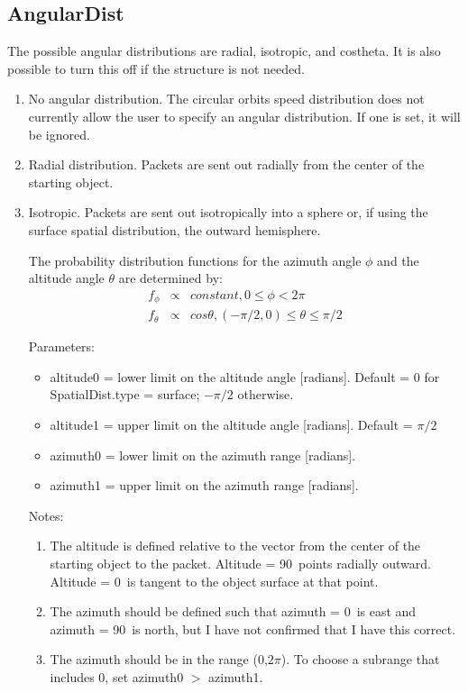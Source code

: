 \documentclass[11pt]{article}
\begin{document}
\subsection{AngularDist}

The possible angular distributions are radial, isotropic, and costheta. It is
also possible to turn this off if the structure is not needed.

\begin{enumerate}
\item No angular distribution. The circular orbits speed distribution does not
currently allow the user to specify an angular distribution. If one is set, it
will be ignored.

\item Radial distribution. Packets are sent out radially from the center of the
starting object.

\item Isotropic. Packets are sent out isotropically into a sphere or, if using
the surface spatial distribution, the outward hemisphere.

The probability distribution functions for the azimuth angle $\phi$ and the
altitude angle $\theta$ are determined by:
\begin{eqnarray}
f_\phi & \propto & constant, 0 \leq \phi < 2\pi \\
f_\theta & \propto & cos \theta, (-\pi/2,0) \leq \theta \leq \pi/2
\end{eqnarray}

Parameters:
  \begin{itemize}
  \item {\color{red}altitude0} = lower limit on the altitude angle [radians].
  Default = 0 for SpatialDist.type = surface; $-\pi/2$ otherwise.
  \item {\color{red}altitude1} = upper limit on the altitude angle [radians].
  Default = $\pi/2$
  \item {\color{red}azimuth0} = lower limit on the azimuth range [radians].
  \item {\color{red}azimuth1} = upper limit on the azimuth range [radians].
  \end{itemize}

Notes: 
  \begin{enumerate}
  \item The altitude is defined relative to the vector from the center of the
  starting object to the packet. Altitude = 90\degr\ points radially outward.
  Altitude = 0\degr\ is tangent to the object surface at that point.
  \item The azimuth should be defined such that azimuth = 0\degr\ is east and
  azimuth = 90\degr\ is north, but I have not confirmed that I have this
  correct.
  \item The azimuth should be in the range (0,$2\pi$). To choose a subrange
  that includes 0, set azimuth0 $>$ azimuth1.
  \end{enumerate}


\end{enumerate}
\end{document}
